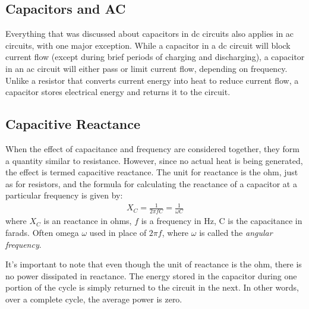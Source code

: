 \documentclass[../../document]{subfiles}
\begin{document}
\subsection{Capacitors and AC}
Everything that was discussed about capacitors in dc circuits also applies in
ac circuits, with one major exception. While a capacitor in a dc circuit will
block current flow (except during brief periods of charging and discharging), a
capacitor in an ac circuit will either pass or limit current flow, depending on
frequency. Unlike a resistor that converts current energy into heat to reduce
current flow, a capacitor stores electrical energy and returns it to the
circuit. \cite{practical_electronics}

\subsection{Capacitive Reactance}
When the effect of capacitance and frequency are considered together, they
form a quantity similar to resistance. However, since no actual heat is being
generated, the effect is termed capacitive reactance. The unit for reactance
is the ohm, just as for resistors, and the formula for calculating the
reactance of a capacitor at a particular frequency is given by:
\begin{gather}
	X_C=\frac{1}{2\pi fC}=\frac{1}{\omega C} \tag{Capacitive reactance}
\end{gather} 
where \(X_C\) is an reactance in ohms, \(f\) is a frequency in \unit{\hertz}, C
is the capacitance in farads. Often omega \(\omega\) used in place of \(2\pi
f\), where \(\omega\) is called the \emph{angular frequency}.
\cite{practical_electronics}

It’s important to note that even though the unit of reactance is the ohm, there
is no power dissipated in reactance. The energy stored in the capacitor during
one portion of the cycle is simply returned to the circuit in the next. In
other words, over a complete cycle, the average power is zero.
\cite{practical_electronics}
\end{document}
